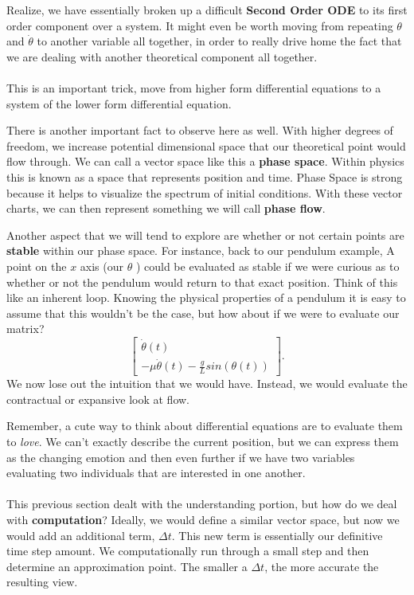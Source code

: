 \documentclass[10pt, oneside]{report}
\begin{document}
Realize, we have essentially broken up a difficult \textbf{Second Order ODE} to its first order component over a system.  It might even be worth moving from repeating $\theta$ and $\dot{\theta}$ to another variable all together, in order to really drive home the fact that we are dealing with another theoretical component all together.
\\
\\
This is an important trick, move from higher form differential equations to a system of the lower form differential equation. 

There is another important fact to observe here as well.  With higher degrees of freedom, we increase potential dimensional space that our theoretical point would flow through.  We can call a vector space like this a \textbf{phase space}.  Within physics this is known as a space that represents position and time.  Phase Space is strong because it helps to visualize the spectrum of initial conditions.  With these vector charts, we can then represent something we will call \textbf{phase flow}.  

Another aspect that we will tend to explore are whether or not certain points are \textbf{stable} within our phase space.  For instance, back to our pendulum example, A point on the $x$ axis (our $\theta$ ) could be evaluated as stable if we were curious as to whether or not the pendulum would return to that exact position.  Think of this like an inherent loop.  
Knowing the physical properties of a pendulum it is easy to assume that this wouldn't be the case, but how about if we were to evaluate our matrix? 
\[
\begin{bmatrix}
    \dot{\theta}(t)\\
    -\mu\dot{\theta}(t) - \frac{g}{L} sin (\theta(t))
\end{bmatrix}
.\] 
We now lose out the intuition that we would have.  Instead, we would evaluate the contractual or expansive look at flow.  

Remember, a cute way to think about differential equations are to evaluate them to \textit{love}.  We can't exactly describe the current position, but we can express them as the changing emotion and then even further if we have two variables evaluating two individuals that are interested in one another. 
\\
\\
This previous section dealt with the understanding portion, but how do we deal with \textbf{computation}?  Ideally, we would define a similar vector space, but now we would add an additional term, $\Delta t$.  This new term is essentially our definitive time step amount.  We computationally run through a small step and then determine an approximation point.  The smaller a $\Delta t$, the more accurate the resulting view.  
\end{document}
